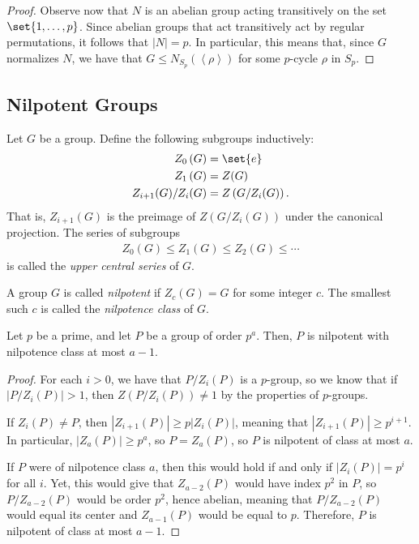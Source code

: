\documentclass[10pt]{mypackage}
\begin{document}
\begin{proof}
  Observe now that $N$ is an abelian group acting transitively on the set $\set{1,\dots,p}$. Since abelian groups that act transitively act by regular permutations, it follows that $\left\vert N \right\vert = p$. In particular, this means that, since $G$ normalizes $N$, we have that $G\leq N_{S_p}\left( \left\langle \rho \right\rangle \right)$ for some $p$-cycle $\rho$ in $S_p$.
\end{proof}
\subsection{Nilpotent Groups}%
\begin{definition}
  Let $G$ be a group. Define the following subgroups inductively:
  \begin{align*}
    Z_0\left( G \right) &= \set{e}\\
    Z_1\left( G \right) &= Z(G)\\
    Z_{i+1}(G)/Z_{i}(G) &= Z\left( G/Z_i(G) \right).
  \end{align*}
  That is, $Z_{i+1}(G)$ is the preimage of $Z\left( G/Z_i(G) \right)$ under the canonical projection. The series of subgroups
  \begin{align*}
    Z_0\left( G \right) \leq Z_1\left( G \right) \leq Z_2\left( G \right)\leq \cdots
  \end{align*}
  is called the \textit{upper central series} of $G$.

  A group $G$ is called \textit{nilpotent} if $Z_c(G) = G$ for some integer $c$. The smallest such $c$ is called the \textit{nilpotence class} of $G$.
\end{definition}
\begin{proposition}
  Let $p$ be a prime, and let $P$ be a group of order $p^{a}$. Then, $P$ is nilpotent with nilpotence class at most $a-1$.
\end{proposition}
\begin{proof}
  For each $i > 0$, we have that $P/Z_i(P)$ is a $p$-group, so we know that if $\left\vert P/Z_i(P) \right\vert > 1$, then $Z\left( P/Z_i(P) \right)\neq 1$ by the properties of $p$-groups.

  If $Z_i(P)\neq P$, then $\left\vert Z_{i+1}(P) \right\vert \geq p\left\vert Z_i(P) \right\vert$, meaning that $\left\vert Z_{i+1}(P) \right\vert \geq p^{i+1}$. In particular, $\left\vert Z_a(P) \right\vert \geq p^{a}$, so $P = Z_a\left( P \right)$, so $P$ is nilpotent of class at most $a$.

  If $P$ were of nilpotence class $a$, then this would hold if and only if $ \left\vert Z_i(P) \right\vert = p^{i} $ for all $i$. Yet, this would give that $Z_{a-2}(P)$ would have index $p^2$ in $P$, so $P/Z_{a-2}(P)$ would be order $p^2$, hence abelian, meaning that $P/Z_{a-2}(P)$ would equal its center and $Z_{a-1}(P)$ would be equal to $p$. Therefore, $P$ is nilpotent of class at most $a-1$.
\end{proof}
\end{document}
